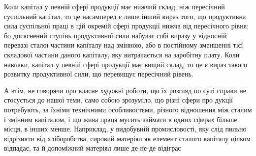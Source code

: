 Коли капітал у певній сфері продукції має нижчий склад, ніж пересічний
суспільний капітал, то це насамперед є лише інший вираз того, що продуктивна
сила суспільної праці в цій окремій сфері продукції нижча від пересічного
рівня; бо досягнений ступінь продуктивної сили набуває собі виразу
у відносній перевазі сталої частини капіталу над змінною, або в постійному
зменшенні тієї складової частини даного капіталу, яку витрачається на заробітну
плату. Коли навпаки, капітал у певній сфері продукції має вищий склад,
то це є вираз такого розвитку продуктивної сили, що перевищує пересічний рівень.

А втім, не говорячи про власне художні роботи, що їх розгляд по суті
справи не стосується до нашої теми, само собою зрозуміло, що різні сфери про дукції потребують, за
їхніми технічними особливостями, різного відношення між сталим і змінним капіталом, і що жива праця
мусить займати в одних сферах більше місця, в інших менше. Наприклад, у видобувній промисловості,
яку слід пильно відрізняти від хліборобства, сировий матеріял як елемент сталого капіталу цілком
відпадає, та й допоміжний матеріял лише де-не-де відіграє
\parbreak{}  %

